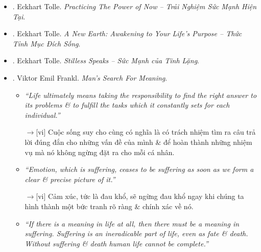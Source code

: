 \documentclass[12pt,twoside]{book}
\begin{document}
\begin{itemize}
\begin{itemize}
		{\sf[en]$\to$[vi]} Bước quan trọng nhất trên hành trình hướng tới giác ngộ của bạn là: Học cách loại bỏ sự đồng nhất khỏi tâm trí của bạn. Mỗi khi bạn tạo ra một khoảng trống trong dòng tâm thức, ánh sáng ý thức của bạn ngày càng mạnh mẽ hơn.
		
		\item {\it``The beginning of freedom is the realization that you are not the possessing entity -- the thinker. Knowing this enables you to observe the entity. The moment you start watching the thinker, a higher level of consciousness becomes activated.''}
		
		{\sf[en]$\to$[vi]} Sự khởi đầu của tự do là việc nhận ra rằng bạn không phải là thực thể sở hữu - người suy nghĩ. Biết được điều này cho phép bạn quan sát thực thể. Khoảnh khắc bạn bắt đầu quan sát người suy nghĩ, mức độ ý thức cao hơn sẽ được kích hoạt.
	\end{itemize}
	Với bản dịch tiếng Việt:
	\item \cite{Tolle_practice_now_VN}. {\sc Eckhart Tolle}. {\it Practicing The Power of Now -- Trải Nghiệm Sức Mạnh Hiện Tại}.
	\item \cite{Tolle_earth_VN}. {\sc Eckhart Tolle}. {\it A New Earth: Awakening to Your Life's Purpose -- Thức Tỉnh Mục Đích Sống}.
	\item \cite{Tolle_stillness_VN}. {\sc Eckhart Tolle}. {\it Stilless Speaks -- Sức Mạnh của Tĩnh Lặng}.
	\item \cite{Frankl_meaning,Frankl_meaning_revised}. {\sc Viktor Emil Frankl}. {\it Man's Search For Meaning}.
	\begin{itemize}
		\item {\it``Life ultimately means taking the responsibility to find the right answer to its problems \& to fulfill the tasks which it constantly sets for each individual.''}
		
		{\sf[en]$\to$[vi]} Cuộc sống suy cho cùng có nghĩa là có trách nhiệm tìm ra câu trả lời đúng đắn cho những vấn đề của mình \& để hoàn thành những nhiệm vụ mà nó không ngừng đặt ra cho mỗi cá nhân.
		
		\item {\it``Emotion, which is suffering, ceases to be suffering as soon as we form a clear \& precise picture of it.''}
		
		{\sf[en]$\to$[vi]} Cảm xúc, tức là đau khổ, sẽ ngừng đau khổ ngay khi chúng ta hình thành một bức tranh rõ ràng \& chính xác về nó.
		
		\item {\it``If there is a meaning in life at all, then there must be a meaning in suffering. Suffering is an ineradicable part of life, even as fate \& death. Without suffering \& death human life cannot be complete.''}
		

\end{itemize}
\end{itemize}
\end{document}
